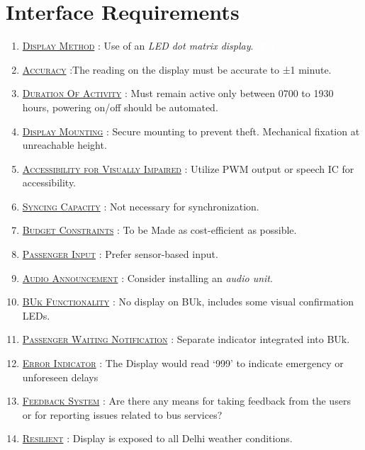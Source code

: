 \section{Interface Requirements}

\begin{enumerate}
    \item {}\underline{\textsc{Display Method}} : Use of an \textit{\gls{LED dot matrix display}}.{\tiny \textcolor{white}{\ac{LED}}}

    \item \underline{\textsc{Accuracy}} :The reading on the display must be accurate to ±1 minute.

    \item \underline{\textsc{Duration Of Activity}} : Must remain active only between 0700 to 1930 hours, powering on/off should be automated.

    \item {}\underline{\textsc{Display Mounting}} : Secure mounting to prevent theft. Mechanical fixation at unreachable height.

    \item \underline{\textsc{Accessibility for Visually Impaired}} :  Utilize \ac{PWM} output or speech IC for accessibility.

    \item {}\underline{\textsc{Syncing Capacity}} : Not necessary for synchronization.

    \item {}\underline{\textsc{Budget Constraints}} : To be Made as cost-efficient as possible.

    \item {}\underline{\textsc{Passenger Input}} : Prefer sensor-based input.

    \item \underline{\textsc{Audio Announcement}} : Consider installing an \textit{\gls{audio unit}}.

    \item {}\underline{\textsc{\ac{BUk} Functionality}} : No display on \ac{BUk}, includes some visual confirmation LEDs.

    \item \underline{\textsc{Passenger Waiting Notification}} : Separate indicator integrated into BUk.

    \item {}\underline{\textsc{Error Indicator}} : The Display would read ‘999’ to indicate emergency or unforeseen delays

    \item \underline{\textsc{Feedback System}} : Are there any means for taking feedback from the users or for reporting issues related to bus services?

    \item \underline{\textsc{Resilient}} : Display is exposed to all Delhi weather conditions.

\end{enumerate}
